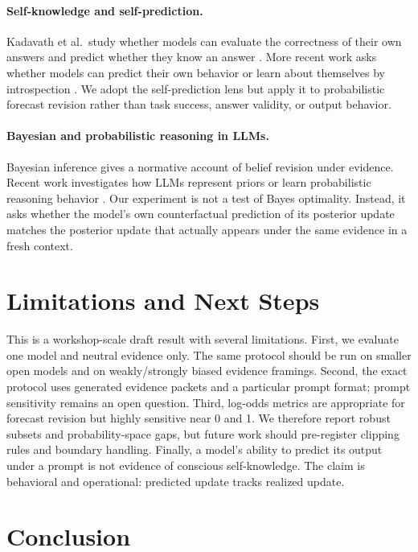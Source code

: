 \documentclass[11pt]{article}
\begin{document}
\paragraph{Self-knowledge and self-prediction.}
Kadavath et al.\ study whether models can evaluate the correctness of their own
answers and predict whether they know an answer \cite{kadavath2022know}. More
recent work asks whether models can predict their own behavior or learn about
themselves by introspection \cite{ashok2025behavior,binder2024inward}. We adopt
the self-prediction lens but apply it to probabilistic forecast revision rather
than task success, answer validity, or output behavior.

\paragraph{Bayesian and probabilistic reasoning in LLMs.}
Bayesian inference gives a normative account of belief revision under evidence.
Recent work investigates how LLMs represent priors or learn probabilistic
reasoning behavior \cite{zhu2024priors,qiu2026bayesian}. Our experiment is not
a test of Bayes optimality. Instead, it asks whether the model's own
counterfactual prediction of its posterior update matches the posterior update
that actually appears under the same evidence in a fresh context.

\section{Limitations and Next Steps}

This is a workshop-scale draft result with several limitations. First, we
evaluate one model and neutral evidence only. The same protocol should be run
on smaller open models and on weakly/strongly biased evidence framings. Second,
the exact protocol uses generated evidence packets and a particular prompt
format; prompt sensitivity remains an open question. Third, log-odds metrics
are appropriate for forecast revision but highly sensitive near 0 and 1. We
therefore report robust subsets and probability-space gaps, but future work
should pre-register clipping rules and boundary handling. Finally, a model's
ability to predict its output under a prompt is not evidence of conscious
self-knowledge. The claim is behavioral and operational: predicted update
tracks realized update.

\section{Conclusion}
\end{document}
